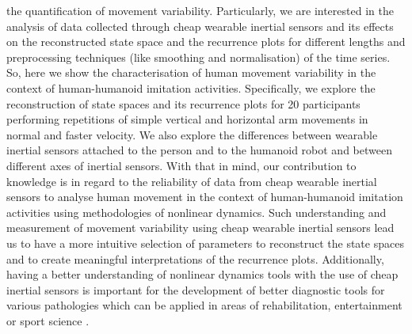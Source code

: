 \documentclass[10pt]{article}
\begin{document}
the quantification of movement variability.
Particularly, we are interested in the analysis of data collected through
cheap wearable inertial sensors and its effects on the 
reconstructed state space and the recurrence plots
for different lengths and preprocessing techniques 
(like smoothing and normalisation) of the time series.
So, here we show the characterisation of human movement variability in the
context of human-humanoid imitation activities.
Specifically, we explore the reconstruction of state spaces and its recurrence plots for
20 participants performing repetitions of simple vertical and horizontal arm 
movements in normal and faster velocity. 
We also explore the differences between wearable inertial sensors attached 
to the person and to the humanoid robot and between different axes of inertial sensors. 
With that in mind, our contribution to knowledge is in regard to the 
reliability of data from cheap wearable inertial sensors 
to analyse human movement in the context of human-humanoid imitation activities 
using methodologies of nonlinear dynamics.
Such understanding and measurement of movement variability using 
cheap wearable inertial sensors lead us to have a more intuitive selection of parameters
to reconstruct the state spaces and to create meaningful interpretations 
of the recurrence plots. Additionally, having a better understanding of 
nonlinear dynamics tools with the use of cheap inertial sensors is important 
for the development of better diagnostic tools for various pathologies which 
can be applied in areas of rehabilitation, entertainment or sport science \cite{tlockhart2013}.
\end{document}
